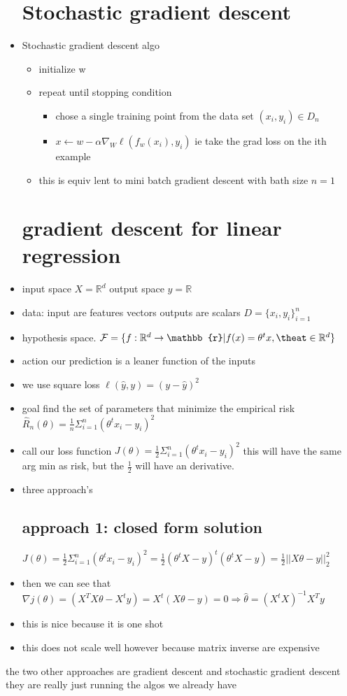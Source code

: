 \documentclass{article}
\begin{document}
\begin{itemize}
\section{Stochastic gradient descent }
\item Stochastic gradient descent algo
\begin{itemize}
    \item initialize w
    \item repeat until stopping condition 
    \begin{itemize}
        \item chose a single training point from the data set $(x_i,y_i)\in D_n$
        \item $x\leftarrow w-\alpha \nabla_{W}\ell(f_{w}(x_i),y_i)$ ie take the grad loss on the ith example 
    \end{itemize}
    \item this is equiv lent to mini batch gradient descent with bath size $n=1$
\end{itemize}
\section{gradient descent for linear regression }
\item input space $X=\mathbb{R}^{d}$ output space $y=\mathbb{R}$
\item data: input are features vectors outputs are scalars $D=\{x_i,y_i\}_{i=1}^{n}$
\item hypothesis space. $\mathcal{F}=\{f:\mathbb{R}^{d}\rightarrow \mathbb{r}|f(x)=\theta^tx, \theat \in \mathbb{R}^{d}\}$ 
\item action our prediction is a leaner function of the inputs
\item we use square loss $\ell(\hat{y},y)=(y-\hat{y})^2$
\item goal find the set of parameters that minimize the empirical risk $\hat{R}_{n}(\theta)=\frac{1}{n}\Sigma_{i=1}^{n}(\theta^{t}x_{i}-y_i)^2$
\item call our loss function $J(\theta)=\frac{1}{2}\Sigma_{i=1}^{n}(\theta^{t}x_i-y_i)^2$  this will have the same arg min as risk, but the $\frac{1}{2}$ will have an derivative.
\item three approach's
\subsection{approach 1: closed form solution}
$J(\theta)=\frac{1}{2}\Sigma_{i=1}^{n}(\theta^{t}x_i-y_i)^2=\frac{1}{2}(\theta^{t}X-y)^{t}(\theta^{t}X-y)=\frac{1}{2}||X\theta-y||_{2}^{2}$
\item then we can see that $\nabla j(\theta)=(X^TX\theta-X^ty)=X^t(X\theta-y)=0\Rightarrow \hat{\theta}=(X^{t}X)^{-1}X^{T}y$
\item this is nice because it is one shot
\item this does not scale well however because matrix inverse are expensive
 \end{itemize}
\item the two other approaches are gradient descent and stochastic gradient descent they are really just running the algos we already have
\end{document}
